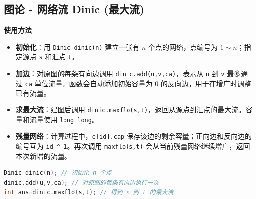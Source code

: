 \documentclass[10pt,landscape,a4paper]{article}
\begin{document}
\begin{multicols*}{3}
\subsection*{图论 - 网络流 Dinic (最大流)}
\par\addvspace{0.7ex}\noindent\textbf{使用方法}\par\nobreak
\begin{itemize}
\item \textbf{初始化}：用 \texttt{D\allowbreak{}i\allowbreak{}n\allowbreak{}i\allowbreak{}c\allowbreak{} \allowbreak{}d\allowbreak{}i\allowbreak{}n\allowbreak{}i\allowbreak{}c\allowbreak{}(\allowbreak{}n\allowbreak{})} 建立一张有 $n$ 个点的网络，点编号为 $1 \sim n$；指定源点 \texttt{s} 和汇点 \texttt{t}。
\item \textbf{加边}：对原图的每条有向边调用 \texttt{d\allowbreak{}i\allowbreak{}n\allowbreak{}i\allowbreak{}c\allowbreak{}.\allowbreak{}a\allowbreak{}d\allowbreak{}d\allowbreak{}(\allowbreak{}u\allowbreak{},\allowbreak{}v\allowbreak{},\allowbreak{}c\allowbreak{}a\allowbreak{})}，表示从 \texttt{u} 到 \texttt{v} 最多通过 \texttt{c\allowbreak{}a} 单位流量。函数会自动添加初始容量为 $0$ 的反向边，用于在增广时调整已有流量。
\item \textbf{求最大流}：建图后调用 \texttt{d\allowbreak{}i\allowbreak{}n\allowbreak{}i\allowbreak{}c\allowbreak{}.\allowbreak{}m\allowbreak{}a\allowbreak{}x\allowbreak{}f\allowbreak{}l\allowbreak{}o\allowbreak{}(\allowbreak{}s\allowbreak{},\allowbreak{}t\allowbreak{})}，返回从源点到汇点的最大流。容量和流量使用 \texttt{l\allowbreak{}o\allowbreak{}n\allowbreak{}g\allowbreak{} \allowbreak{}l\allowbreak{}o\allowbreak{}n\allowbreak{}g}。
\item \textbf{残量网络}：计算过程中，\texttt{e\allowbreak{}[\allowbreak{}i\allowbreak{}d\allowbreak{}]\allowbreak{}.\allowbreak{}c\allowbreak{}a\allowbreak{}p} 保存该边的剩余容量；正向边和反向边的编号互为 \texttt{i\allowbreak{}d\allowbreak{} \allowbreak{}\textasciicircum{}\allowbreak{} \allowbreak{}1}。再次调用 \texttt{m\allowbreak{}a\allowbreak{}x\allowbreak{}f\allowbreak{}l\allowbreak{}o\allowbreak{}(\allowbreak{}s\allowbreak{},\allowbreak{}t\allowbreak{})} 会从当前残量网络继续增广，返回本次新增的流量。
\end{itemize}
\begin{lstlisting}[language=C++,numbers=none,basicstyle=\footnotesize\ttfamily]
Dinic dinic(n); // 初始化 n 个点
dinic.add(u,v,ca); // 对原图的每条有向边执行一次
int ans=dinic.maxflo(s,t); // 得到 s 到 t 的最大流
\end{lstlisting}


\end{multicols*}
\end{document}
